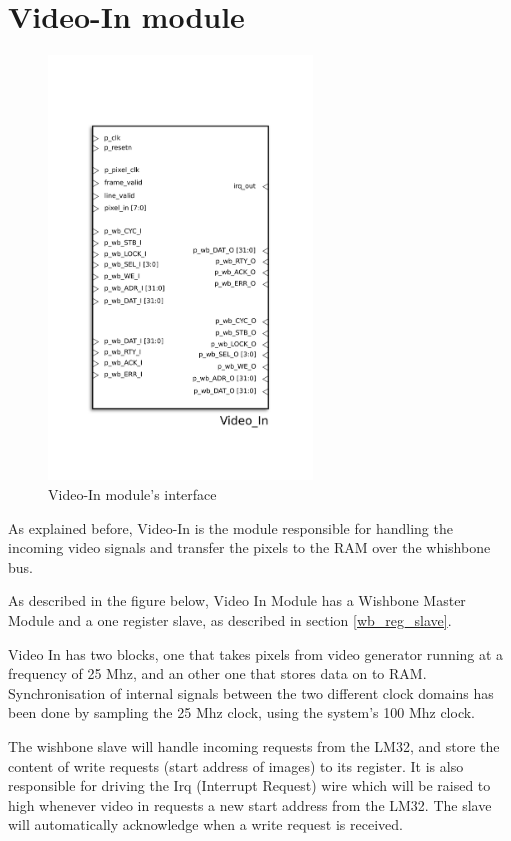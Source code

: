 
\section{Video-In module}
\begin{figure}[H]
\center
\includegraphics[width=7cm]{figs/Video_in.pdf}
\caption{Video-In module's interface}
\label{VideoIn_interface}
\end{figure}

As explained before, Video-In is the module responsible for handling the incoming video signals and transfer the pixels to the RAM over the whishbone bus.

As described in the figure below, Video In Module has a Wishbone Master Module and a one register slave, as described in section \ref{wb_reg_slave}.

Video In has two blocks, one that takes pixels from video generator running at a frequency of 25 Mhz, and an other one that stores data on to RAM. Synchronisation of internal signals between the two different clock domains has been done by sampling the 25 Mhz clock, using the system's 100 Mhz clock.

The wishbone slave will handle incoming requests from the LM32, and store the content of write requests (start address of images) to its register. It is also responsible for driving the Irq (Interrupt Request) wire which will be raised to high whenever video in requests a new start address from the LM32. The slave will automatically acknowledge when a write request is received.

